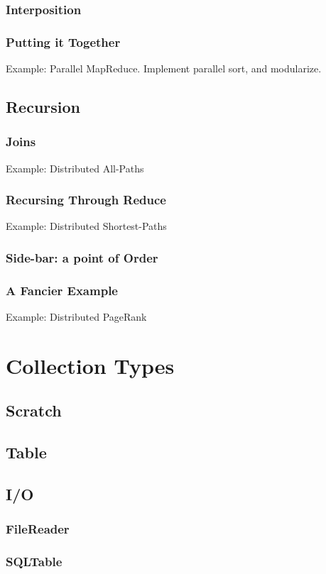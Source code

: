 \documentclass[]{book}
\begin{document}
        \subsection{Interposition}
        \subsection{Putting it Together}
        Example: Parallel MapReduce.  Implement parallel sort, and modularize.
    \section{Recursion}
        \subsection{Joins}
        Example: Distributed All-Paths
        \subsection{Recursing Through Reduce}
        Example: Distributed Shortest-Paths
        \subsection{Side-bar: a point of Order}
        \subsection{A Fancier Example}
        Example: Distributed PageRank

\chapter{Collection Types}
    \section{Scratch}
    \section{Table}
	\section{I/O}
	  \subsection{FileReader}
	  \subsection{SQLTable}
\end{document}
